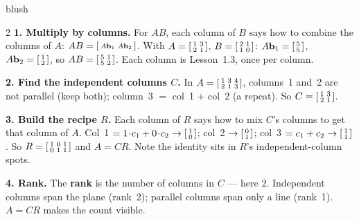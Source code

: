 \documentclass[10pt]{article}
\newcommand{\bb}{\mathbf{b}}
\begin{document}
\begin{skillbox}[Lesson]{blush}
\begin{multicols}{2}
\textbf{1. Multiply by columns.} For $AB$, each column of $B$ says how to combine the columns of
$A$: $AB=\begin{bsmallmatrix} A\bb_1 & A\bb_2 \end{bsmallmatrix}$. With
$A=\begin{bsmallmatrix} 1&3\\2&1 \end{bsmallmatrix}$, $B=\begin{bsmallmatrix} 2&1\\1&0 \end{bsmallmatrix}$:
$A\bb_1=\begin{bsmallmatrix} 5\\5 \end{bsmallmatrix}$, $A\bb_2=\begin{bsmallmatrix} 1\\2 \end{bsmallmatrix}$,
so $AB=\begin{bsmallmatrix} 5&1\\5&2 \end{bsmallmatrix}$. Each column is Lesson~1.3, once per column.

\textbf{2. Find the independent columns $C$.} In
$A=\begin{bsmallmatrix} 1&3&4\\2&1&3 \end{bsmallmatrix}$, columns~1 and~2 are not parallel (keep
both); column~3 $=$ col~1 $+$ col~2 (a repeat). So $C=\begin{bsmallmatrix} 1&3\\2&1 \end{bsmallmatrix}$.

\columnbreak

\textbf{3. Build the recipe $R$.} Each column of $R$ says how to mix $C$'s columns to get that
column of $A$. Col~1 $=1\!\cdot\!c_1+0\!\cdot\!c_2\to\begin{bsmallmatrix} 1\\0 \end{bsmallmatrix}$;
col~2 $\to\begin{bsmallmatrix} 0\\1 \end{bsmallmatrix}$; col~3 $=c_1+c_2\to\begin{bsmallmatrix} 1\\1 \end{bsmallmatrix}$.
So $R=\begin{bsmallmatrix} 1&0&1\\0&1&1 \end{bsmallmatrix}$ and $A=CR$. Note the identity sits in
$R$'s independent-column spots.

\textbf{4. Rank.} The \textbf{rank} is the number of columns in $C$ --- here $2$. Independent
columns span the plane (rank~2); parallel columns span only a line (rank~1). $A=CR$ makes the
count visible.
\end{multicols}
\end{skillbox}
\end{document}

